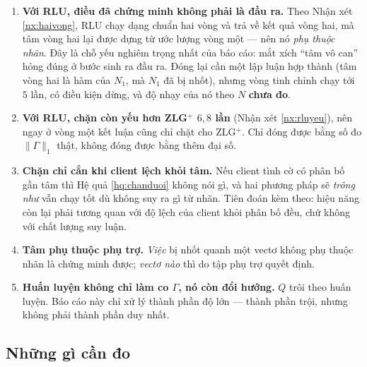 \documentclass[11pt,a4paper]{article}
\theoremstyle{remark}
\begin{document}
\begin{enumerate}
\item\label{item:hvong} \textbf{Với RLU, điều đã chứng minh không phải là
  đầu ra.} Theo Nhận xét \ref{nx:haivong}, RLU chạy dạng chuẩn hai vòng và
  trả về kết quả vòng hai, mà tâm vòng hai lại được dựng từ ước lượng vòng
  một --- nên nó \emph{phụ thuộc nhãn}. Đây là chỗ yếu nghiêm trọng nhất của
  báo cáo: mắt xích ``tâm vô can'' hỏng đúng ở bước sinh ra đầu ra. Đóng lại
  cần một lập luận hợp thành (tâm vòng hai là hàm của $N_1$, mà $N_1$ đã bị
  nhốt), nhưng vòng tinh chỉnh chạy tới $5$ lần, có điều kiện dừng, và độ
  nhạy của nó theo $N$ \textbf{chưa đo}.

\item \textbf{Với RLU, chặn còn yếu hơn ZLG$^+$ $6{,}8$ lần} (Nhận xét
  \ref{nx:rluyeu}), nên ngay ở vòng một kết luận cũng chỉ chặt cho ZLG$^+$.
  Chỉ đóng được bằng số đo $\|\Gamma\|_1$ thật, không đóng được bằng thêm đại
  số.
\item \textbf{Chặn chỉ cắn khi client lệch khỏi tâm.} Nếu client tình cờ có
  phân bố gần tâm thì Hệ quả \ref{hq:chanduoi} không nói gì, và hai phương
  pháp sẽ \emph{trông như} vẫn chạy tốt dù không suy ra gì từ nhãn. Tiên đoán
  kèm theo: hiệu năng còn lại phải tương quan với độ lệch của client khỏi
  phân bố đều, chứ không với chất lượng suy luận.
\item \textbf{Tâm phụ thuộc phụ trợ.} \emph{Việc} bị nhốt quanh một vectơ
  không phụ thuộc nhãn là chứng minh được; \emph{vectơ nào} thì do tập phụ
  trợ quyết định.
\item \textbf{Huấn luyện không chỉ làm co $\Gamma$, nó còn đổi hướng.} $Q$
  trôi theo huấn luyện. Báo cáo này chỉ xử lý thành phần độ lớn --- thành
  phần trội, nhưng không phải thành phần duy nhất.
\end{enumerate}

\subsection{Những gì cần đo}
\end{document}
